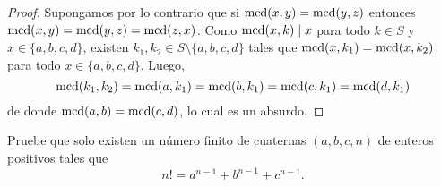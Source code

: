 \begin{proof}
	Supongamos por lo contrario que si $\operatorname{mcd}(x,y)=\operatorname{mcd}(y,z)$ entonces $\operatorname{mcd}(x,y)=\operatorname{mcd}(y,z)=\operatorname{mcd}(z,x)$. Como $\operatorname{mcd}(x,k)\mid x$ para todo $k\in S$ y $x\in\{a,b,c,d\}$, existen $k_1,k_2\in S\setminus\{a,b,c,d\}$ tales que $\operatorname{mcd}(x,k_1)=\operatorname{mcd}(x,k_2)$ para todo $x\in\{a,b,c,d\}$. Luego,
	\[\operatorname{mcd}(k_1,k_2)=\operatorname{mcd}(a,k_1)=\operatorname{mcd}(b,k_1)=\operatorname{mcd}(c,k_1)=\operatorname{mcd}(d,k_1)\]
	de donde $\operatorname{mcd}(a,b)=\operatorname{mcd}(c,d)$, lo cual es un absurdo.
\end{proof}

\begin{probMB}
	Pruebe que solo existen un número finito de cuaternas $(a,b,c,n)$ de enteros positivos tales que
	\[n!=a^{n-1}+b^{n-1}+c^{n-1}.\]
\end{probMB}

